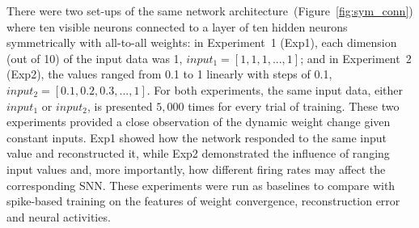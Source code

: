 There were two set-ups of the same network architecture~(Figure~\ref{fig:sym_conn}) where ten visible neurons connected to a layer of ten hidden neurons symmetrically with all-to-all weights: in Experiment~1 (Exp1), each dimension (out of 10) of the input data was 1, $input_1 = [1, 1, 1,...,1]$; and in Experiment~2 (Exp2), the values ranged from 0.1 to 1 linearly with steps of 0.1, $input_2 = [0.1, 0.2, 0.3,...,1]$.
For both experiments, the same input data, either $input_1$ or $input_2$, is presented $5,000$ times for every trial of training.
These two experiments provided a close observation of the dynamic weight change given constant inputs.
Exp1 showed how the network responded to the same input value and reconstructed it, while Exp2 demonstrated the influence of ranging input values and, more importantly, how different firing rates may affect the corresponding SNN.
These experiments were run as baselines to compare with spike-based training on the features of weight convergence, reconstruction error and neural activities.


